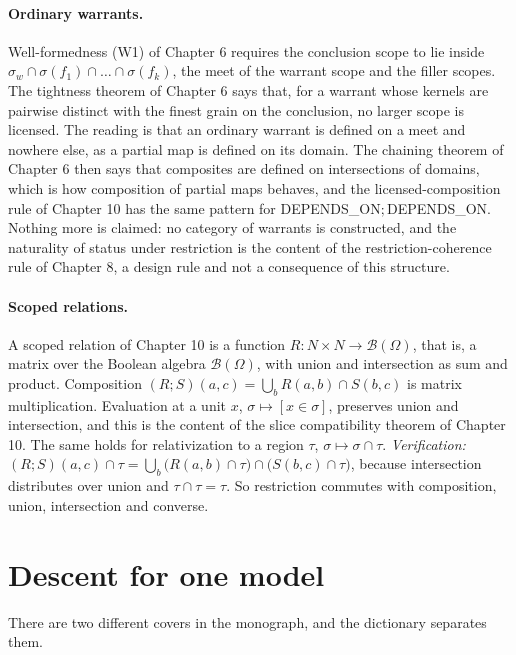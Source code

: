 \documentclass[11pt]{article}
\theoremstyle{plain}
\theoremstyle{definition}
\theoremstyle{remark}
\newcommand{\Om}{\Omega}
\newcommand{\B}{\mathcal{B}}
\begin{document}
\paragraph{Ordinary warrants.} Well-formedness (W1) of Chapter 6 requires the conclusion scope to lie inside $\sigma_w\cap\sigma(f_1)\cap\dots\cap\sigma(f_k)$, the meet of the warrant scope and the filler scopes. The tightness theorem of Chapter 6 says that, for a warrant whose kernels are pairwise distinct with the finest grain on the conclusion, no larger scope is licensed. The reading is that an ordinary warrant is defined on a meet and nowhere else, as a partial map is defined on its domain. The chaining theorem of Chapter 6 then says that composites are defined on intersections of domains, which is how composition of partial maps behaves, and the licensed-composition rule of Chapter 10 has the same pattern for \textsf{DEPENDS\_ON}$;$\textsf{DEPENDS\_ON}. Nothing more is claimed: no category of warrants is constructed, and the naturality of status under restriction is the content of the restriction-coherence rule of Chapter 8, a design rule and not a consequence of this structure.

\paragraph{Scoped relations.} A scoped relation of Chapter 10 is a function $R:N\times N\to\B(\Om)$, that is, a matrix over the Boolean algebra $\B(\Om)$, with union and intersection as sum and product. Composition $(R;S)(a,c)=\bigcup_bR(a,b)\cap S(b,c)$ is matrix multiplication. Evaluation at a unit $x$, $\sigma\mapsto[x\in\sigma]$, preserves union and intersection, and this is the content of the slice compatibility theorem of Chapter 10. The same holds for relativization to a region $\tau$, $\sigma\mapsto\sigma\cap\tau$. \emph{Verification:} $(R;S)(a,c)\cap\tau=\bigcup_b\bigl(R(a,b)\cap\tau\bigr)\cap\bigl(S(b,c)\cap\tau\bigr)$, because intersection distributes over union and $\tau\cap\tau=\tau$. So restriction commutes with composition, union, intersection and converse.

\section{Descent for one model}\label{sec:descent}

There are two different covers in the monograph, and the dictionary separates them.
\end{document}
